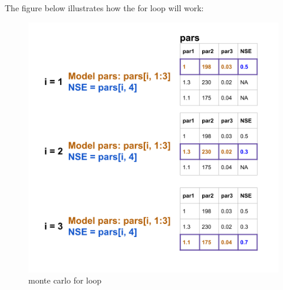 \documentclass[
]{book}
\begin{document}
The figure below illustrates how the for loop will work:

\begin{figure}
\centering
\includegraphics{images/monte carlo for loop.png}
\caption{monte carlo for loop}
\end{figure}
\end{document}
